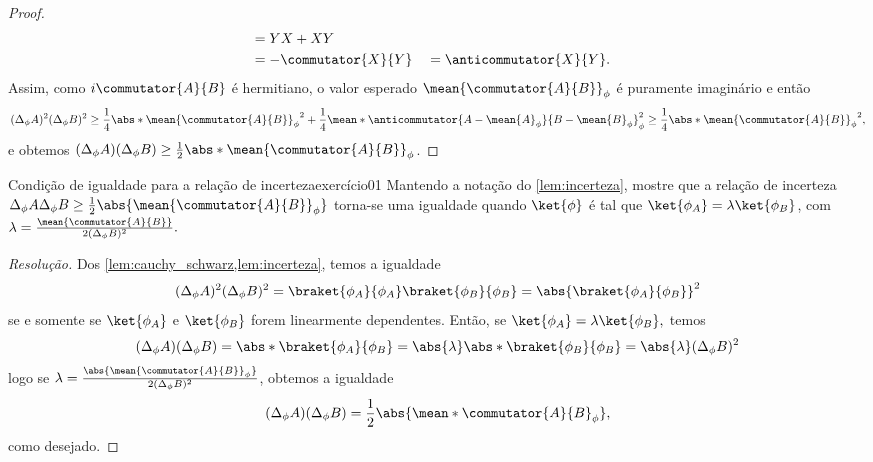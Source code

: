 \begin{proof}
\begin{align*}
                                 &= YX + XY\\
                                 &= -\commutator{X}{Y}&
                                 &= \anticommutator{X}{Y}.
    \end{align*}
    Assim, como \(i \commutator{A}{B}\) é hermitiano, o valor esperado \(\mean{\commutator{A}{B}}_\phi\) é puramente imaginário e então
    \begin{equation*}
        (\Delta_\phi A)^2 (\Delta_\phi B)^2 \geq \frac14 \abs*{\mean{\commutator{A}{B}}_\phi}^2 + \frac14 \mean*{\anticommutator{A - \mean{A}_\phi}{B - \mean{B}_\phi}}_\phi^2 \geq \frac14 \abs*{\mean{\commutator{A}{B}}_\phi}^2,
    \end{equation*}
    e obtemos \((\Delta_\phi A) (\Delta_\phi B) \geq \frac12 \abs*{\mean{\commutator{A}{B}}_\phi}\).
\end{proof}

\begin{exercício}{Condição de igualdade para a relação de incerteza}{exercício01}
    Mantendo a notação do \cref{lem:incerteza}, mostre que a relação de incerteza \(\Delta_\phi A \Delta_\phi B \geq \frac12\abs{\mean{\commutator{A}{B}}_\phi}\) torna-se uma igualdade quando \(\ket{\phi}\) é tal que \(\ket{\phi_A} = \lambda \ket{\phi_B}\), com \(\lambda = \frac{\mean{\commutator{A}{B}}}{2 (\Delta_\phi B)^2}.\)
\end{exercício}
\begin{proof}[Resolução]
    Dos \cref{lem:cauchy_schwarz,lem:incerteza}, temos a igualdade
    \begin{equation*}
        (\Delta_\phi A)^2(\Delta_\phi B)^2 = \braket{\phi_A}{\phi_A}\braket{\phi_B}{\phi_B} = \abs{\braket{\phi_A}{\phi_B}}^2
    \end{equation*}
    se e somente se \(\ket{\phi_A}\) e \(\ket{\phi_B}\) forem linearmente dependentes. Então, se \(\ket{\phi_A} = \lambda \ket{\phi_B},\) temos
    \begin{equation*}
        (\Delta_\phi A) (\Delta_\phi B) = \abs*{\braket{\phi_A}{\phi_B}} = \abs{\lambda} \abs*{\braket{\phi_B}{\phi_B}} = \abs{\lambda} (\Delta_{\phi}B)^2
    \end{equation*}
    logo se \(\lambda = \frac{\abs{\mean{\commutator{A}{B}}_\phi}}{2 (\Delta_\phi B)^2}\), obtemos a igualdade
    \begin{equation*}
        (\Delta_\phi A)(\Delta_\phi B) = \frac12 \abs{\mean*{\commutator{A}{B}}_\phi},
    \end{equation*}
    como desejado.
\end{proof}
